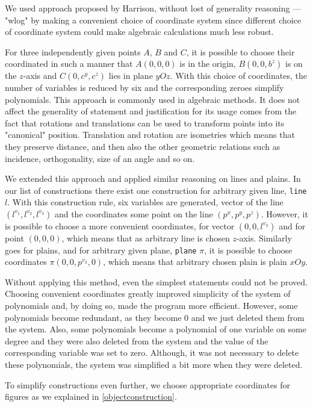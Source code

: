 \documentclass{aicom2e}
\begin{document}
We used approach proposed by Harrison, without lost of generality
reasoning --- "wlog" \cite{harrison} by making a convenient choice of
coordinate system since different choice of coordinate system could
make algebraic calculations much less robust. 

For three independently given points $A$, $B$ and $C$, it is possible
to choose their coordinated in such a manner that $A(0, 0, 0)$ is in
the origin, $B(0, 0, b^z)$ is on the $z$-axis and $C(0, c^y, c^z)$
lies in plane $yOz$. With this choice of coordinates, the number of
variables is reduced by six and the corresponding zeroes simplify
polynomials. This approach is commonly used in algebraic methods. It
does not affect the generality of statement and justification for its
usage comes from the fact that rotations and translations can be used
to transform points into its "canonical" position. Translation and
rotation are isometries which means that they preserve distance, and
then also the other geometric relations such as incidence,
orthogonality, size of an angle and so on.

We extended this approach and applied similar reasoning on lines and
plains. In our list of constructions there exist one construction for
arbitrary given line, {\tt line} $l$. With this construction rule, six
variables are generated, vector of the line $(l^{v_1}, l^{v_2},
l^{v_3})$ and the coordinates some point on the line $(p^x, p^y,
p^z)$. However, it is possible to choose a more convenient
coordinates, for vector $(0, 0, l^{v_3})$ and for point $(0, 0, 0)$,
which means that as arbitrary line is chosen $z$-axis. Similarly goes
for plains, and for arbitrary given plane, {\tt plane} $\pi$, it is
possible to choose coordinates $\pi (0, 0, p^{v_3}, 0)$, which means
that arbitrary chosen plain is plain $xOy$.

Without applying this method, even the simplest statements could not
be proved. Choosing convenient coordinates greatly improved simplicity
of the system of polynomials and, by doing so, made the program more
efficient. However, some polynomials become redundant, as they become
$0$ and we just deleted them from the system. Also, some polynomials
become a polynomial of one variable on some degree and they were also
deleted from the system and the value of the corresponding variable
was set to zero. Although, it was not necessary to delete these
polynomials, the system was simplified a bit more when they were
deleted.

To simplify constructions even further, we choose appropriate
coordinates for figures as we explained in \ref{objectconstruction}.
\end{document}

